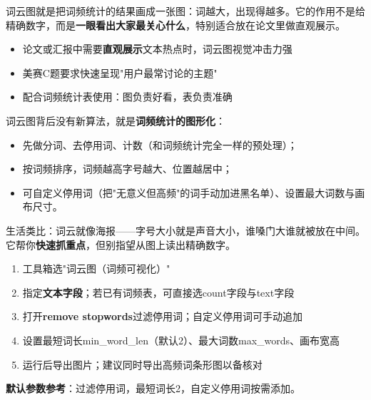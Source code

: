 \begin{algointro}
词云图就是把词频统计的结果画成一张图：词越大，出现得越多。它的作用不是给精确数字，而是\textbf{一眼看出大家最关心什么}，特别适合放在论文里做直观展示。
\end{algointro}

\begin{algoscene}
\begin{itemize}
    \item 论文或汇报中需要\textbf{直观展示}文本热点时，词云图视觉冲击力强
    \item 美赛C题要求快速呈现"用户最常讨论的主题"
    \item 配合词频统计表使用：图负责好看，表负责准确
\end{itemize}
\end{algoscene}

\begin{algoprinciple}
词云图背后没有新算法，就是\textbf{词频统计的图形化}：

\begin{itemize}
    \item 先做分词、去停用词、计数（和词频统计完全一样的预处理）；
    \item 按词频排序，词频越高字号越大、位置越居中；
    \item 可自定义停用词（把"无意义但高频"的词手动加进黑名单）、设置最大词数与画布尺寸。
\end{itemize}

生活类比：词云就像海报——字号大小就是声音大小，谁嗓门大谁就被放在中间。它帮你\textbf{快速抓重点}，但别指望从图上读出精确数字。
\end{algoprinciple}

\begin{algosposs}
\begin{enumerate}
    \item 工具箱选"词云图（词频可视化）"
    \item 指定\textbf{文本字段}；若已有词频表，可直接选count字段与text字段
    \item 打开\textbf{remove stopwords}过滤停用词；自定义停用词可手动追加
    \item 设置最短词长min\_word\_len（默认2）、最大词数max\_words、画布宽高
    \item 运行后导出图片；建议同时导出高频词条形图以备核对
\end{enumerate}

\textbf{默认参数参考}：过滤停用词，最短词长2，自定义停用词按需添加。
\end{algosposs}

